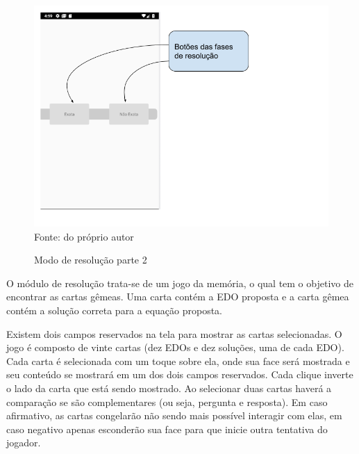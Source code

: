 \begin{figure}[H]
\centering
\caption{Modo de resolução parte 2}
\includegraphics[scale=0.72]{figuras/modo_resolucao_2.png}
\small{Fonte: do próprio autor}
\end{figure}


O módulo de resolução trata-se de um jogo da memória, o qual tem o objetivo de encontrar as cartas gêmeas. Uma carta contém a EDO proposta e a carta gêmea contém a solução correta para a equação proposta.

Existem dois campos reservados na tela para mostrar as cartas selecionadas. O jogo é composto de vinte cartas (dez EDOs e dez soluções, uma de cada EDO). Cada carta é selecionada com um toque sobre ela, onde sua face será mostrada e seu conteúdo se mostrará em um dos dois campos reservados. Cada clique inverte o lado da carta que está sendo mostrado. Ao selecionar duas cartas haverá a comparação se são complementares (ou seja, pergunta e resposta). Em caso afirmativo, as cartas congelarão não sendo mais possível interagir com elas, em caso negativo apenas esconderão sua face para que inicie outra tentativa do jogador.

